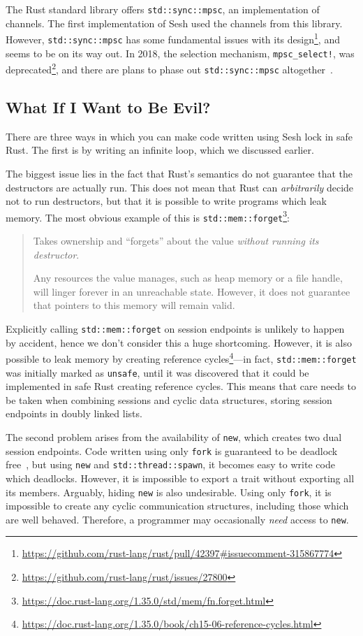 \documentclass[copyright,creativecommons]{eptcs}
\begin{document}
The Rust standard library offers \lstinline{std::sync::mpsc}, an implementation of channels. The first implementation of Sesh used the channels from this library. However, \lstinline{std::sync::mpsc} has some fundamental issues with its design\footnote{\url{https://github.com/rust-lang/rust/pull/42397\#issuecomment-315867774}}, and seems to be on its way out. In 2018, the selection mechanism, \lstinline{mpsc_select!}, was deprecated\footnote{\url{https://github.com/rust-lang/rust/issues/27800}}, and there are plans to phase out \lstinline{std::sync::mpsc} altogether~\cite{glavina2019}.


\subsection{What If I Want to Be Evil?}\label{sec:limitations}
There are three ways in which you can make code written using Sesh lock in safe Rust. The first is by writing an infinite loop, which we discussed earlier.

The biggest issue lies in the fact that Rust's semantics do not guarantee that the destructors are actually run. This does not mean that Rust can \emph{arbitrarily} decide not to run destructors, but that it is possible to write programs which leak memory. The most obvious example of this is \lstinline{std::mem::forget}\footnote{\url{https://doc.rust-lang.org/1.35.0/std/mem/fn.forget.html}}:
\begin{quotation}
  \noindent
  Takes ownership and ``forgets'' about the value \emph{without running its destructor}.

  \noindent
  Any resources the value manages, such as heap memory or a file handle, will linger forever in an unreachable state. However, it does not guarantee that pointers to this memory will remain valid.
\end{quotation}
Explicitly calling \lstinline{std::mem::forget} on session endpoints is unlikely to happen by accident, hence we don't consider this a huge shortcoming. However, it is also possible to leak memory by creating reference cycles\footnote{\url{https://doc.rust-lang.org/1.35.0/book/ch15-06-reference-cycles.html}}---in fact, \lstinline{std::mem::forget} was initially marked as \lstinline{unsafe}, until it was discovered that it could be implemented in safe Rust creating reference cycles. This means that care needs to be taken when combining sessions and cyclic data structures, \eg storing session endpoints in doubly linked lists.

The second problem arises from the availability of \lstinline{new}, which creates two dual session endpoints. Code written using only \lstinline{fork} is guaranteed to be deadlock free~\cite{lindley2015}, but using \lstinline{new} and \lstinline{std::thread::spawn}, it becomes easy to write code which deadlocks. However, it is impossible to export a trait without exporting all its members. Arguably, hiding \lstinline{new} is also undesirable. Using only \lstinline{fork}, it is impossible to create any cyclic communication structures, including those which are well behaved. Therefore, a programmer may occasionally \emph{need} access to \lstinline{new}.
\end{document}
